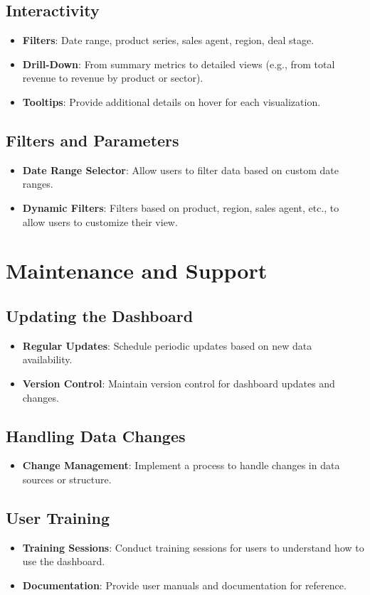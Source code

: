 \documentclass{article}
\begin{document}
\subsection{Interactivity}
\begin{itemize}
    \item \textbf{Filters}: Date range, product series, sales agent, region, deal stage.
    \item \textbf{Drill-Down}: From summary metrics to detailed views (e.g., from total revenue to revenue by product or sector).
    \item \textbf{Tooltips}: Provide additional details on hover for each visualization.
\end{itemize}

\subsection{Filters and Parameters}
\begin{itemize}
    \item \textbf{Date Range Selector}: Allow users to filter data based on custom date ranges.
    \item \textbf{Dynamic Filters}: Filters based on product, region, sales agent, etc., to allow users to customize their view.
\end{itemize}

\section{Maintenance and Support}

\subsection{Updating the Dashboard}
\begin{itemize}
    \item \textbf{Regular Updates}: Schedule periodic updates based on new data availability.
    \item \textbf{Version Control}: Maintain version control for dashboard updates and changes.
\end{itemize}

\subsection{Handling Data Changes}
\begin{itemize}
    \item \textbf{Change Management}: Implement a process to handle changes in data sources or structure.
\end{itemize}

\subsection{User Training}
\begin{itemize}
    \item \textbf{Training Sessions}: Conduct training sessions for users to understand how to use the dashboard.
    \item \textbf{Documentation}: Provide user manuals and documentation for reference.
\end{itemize}
\end{document}
